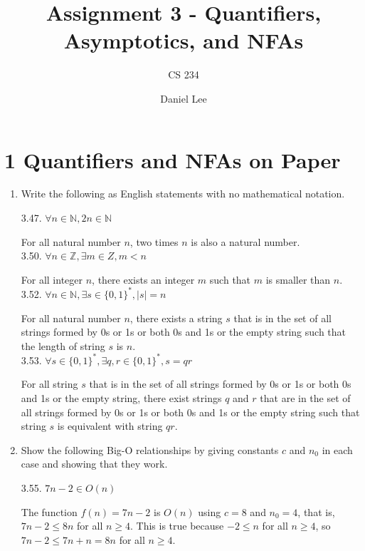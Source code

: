 \documentclass[10pt]{article}
\title{Assignment 3 - Quantifiers, Asymptotics, and NFAs}
\author{CS 234}
\date{Daniel Lee}
\begin{document}
\maketitle

\section*{1 \quad Quantifiers and NFAs on Paper}

\begin{enumerate}[label={}]
      \item Write the following as English statements with no mathematical notation.


            3.47. $\forall n \in \mathbb{N}, 2 n \in \mathbb{N}$

            For all natural number $n$, two times $n$ is also a natural number.\\


            3.50. $\forall n \in \mathbb{Z}, \exists m \in Z, m<n$

            For all integer $n$, there exists an integer $m$ such that $m$ is smaller than $n$.\\


            3.52. $\forall n \in \mathbb{N}, \exists s \in\{0,1\}^*,|s|=n$

            For all natural number $n$, there exists a string $s$ that is in the set of all strings formed by 0s or 1s or both 0s and 1s or the empty string such that the length of string $s$ is $n$.\\


            3.53. $\forall s \in\{0,1\}^*, \exists q, r \in\{0,1\}^*, s=q r$

            For all string $s$ that is in the set of all strings formed by 0s or 1s or both 0s and 1s or the empty string, there exist strings $q$ and $r$ that are in the set of all strings formed by 0s or 1s or both 0s and 1s or the empty string such that string $s$ is equivalent with string $qr$.\\


      \item Show the following Big-O relationships by giving constants $c$ and $n_0$ in each case and showing that they work.


            3.55. $7 n-2 \in O(n)$

            The function $f(n)=7 n-2$ is $O(n)$ using $c=8$ and $n_0=4$, that is, $7 n-2 \leq 8 n$ for all $n \geq 4$. This is true because $-2 \leq n$ for all $n \geq 4$, so $7 n-2 \leq 7 n+n=8 n$ for all $n \geq 4$.\\



\end{enumerate}
\end{document}
